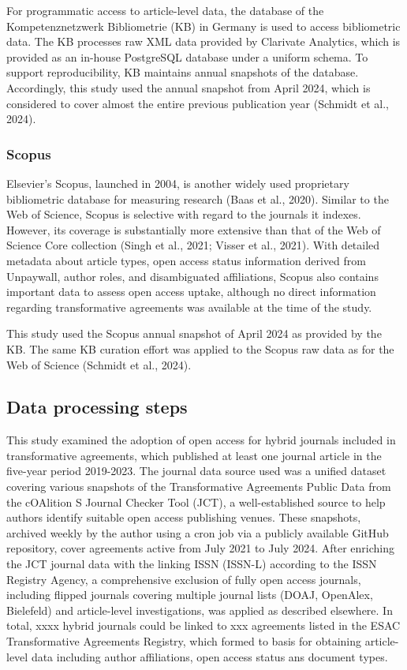 \documentclass[a4paper,man,floatsintext,longtable,noextraspace,12pt]{apa6}
\begin{document}
For programmatic access to article-level data, the database of the
Kompetenznetzwerk Bibliometrie (KB) in Germany is used to access
bibliometric data. The KB processes raw XML data provided by Clarivate
Analytics, which is provided as an in-house PostgreSQL database under a
uniform schema. To support reproducibility, KB maintains annual
snapshots of the database. Accordingly, this study used the annual
snapshot from April 2024, which is considered to cover almost the entire
previous publication year (Schmidt et al., 2024).

\subsubsection{Scopus}\label{scopus}

Elsevier's Scopus, launched in 2004, is another widely used proprietary
bibliometric database for measuring research (Baas et al., 2020).
Similar to the Web of Science, Scopus is selective with regard to the
journals it indexes. However, its coverage is substantially more
extensive than that of the Web of Science Core collection (Singh et al.,
2021; Visser et al., 2021). With detailed metadata about article types,
open access status information derived from Unpaywall, author roles, and
disambiguated affiliations, Scopus also contains important data to
assess open access uptake, although no direct information regarding
transformative agreements was available at the time of the study.

This study used the Scopus annual snapshot of April 2024 as provided by
the KB. The same KB curation effort was applied to the Scopus raw data
as for the Web of Science (Schmidt et al., 2024).

\subsection{Data processing steps}\label{data-processing-steps}

This study examined the adoption of open access for hybrid journals
included in transformative agreements, which published at least one
journal article in the five-year period 2019-2023. The journal data
source used was a unified dataset covering various snapshots of the
Transformative Agreements Public Data from the cOAlition S Journal
Checker Tool (JCT), a well-established source to help authors identify
suitable open access publishing venues. These snapshots, archived weekly
by the author using a cron job via a publicly available GitHub
repository, cover agreements active from July 2021 to July 2024. After
enriching the JCT journal data with the linking ISSN (ISSN-L) according
to the ISSN Registry Agency, a comprehensive exclusion of fully open
access journals, including flipped journals covering multiple journal
lists (DOAJ, OpenAlex, Bielefeld) and article-level investigations, was
applied as described elsewhere. In total, xxxx hybrid journals could be
linked to xxx agreements listed in the ESAC Transformative Agreements
Registry, which formed to basis for obtaining article-level data
including author affiliations, open access status ans document types.
\end{document}
